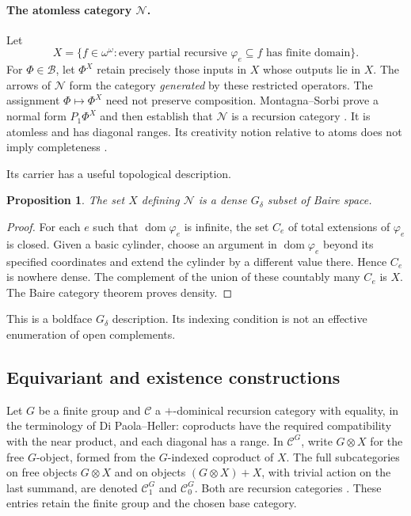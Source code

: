 \documentclass[11pt]{article}
\newtheorem{proposition}[theorem]{Proposition}
\theoremstyle{definition}
\newcommand{\N}{\omega}
\newcommand{\C}{\mathcal C}
\newcommand{\dom}{\operatorname{dom}}
\begin{document}
\paragraph{The atomless category $\mathcal N$.}
Let
\[
 X=\{f\in\N^{\N}:\text{every partial recursive }\varphi_e\subseteq f
                         \text{ has finite domain}\}.
\]
For $\Phi\in\mathcal B$, let $\Phi^X$ retain precisely those inputs
in $X$ whose outputs lie in $X$. The arrows of $\mathcal N$ form the
category \emph{generated} by these restricted operators. The assignment
$\Phi\mapsto\Phi^X$ need not preserve composition. Montagna--Sorbi
prove a normal form $P_1\Phi^X$ and then establish that $\mathcal N$
is a recursion category \cite[Definitions 4.1--4.2, Lemma 4.3,
Proposition 4.1, pp.~1038--1040]{MS}. It is atomless and has diagonal
ranges. Its creativity notion relative to atoms does not imply
completeness \cite[Theorems 4.1--4.2]{MS}.

Its carrier has a useful topological description.
\begin{proposition}\label{prop:dense}
The set $X$ defining $\mathcal N$ is a dense $G_\delta$ subset of
Baire space.
\end{proposition}
\begin{proof}
For each $e$ such that $\dom\varphi_e$ is infinite, the set $C_e$ of
total extensions of $\varphi_e$ is closed. Given a basic cylinder,
choose an argument in $\dom\varphi_e$ beyond its specified coordinates
and extend the cylinder by a different value there. Hence $C_e$ is
nowhere dense. The complement of the union of these countably many
$C_e$ is $X$. The Baire category theorem proves density.
\end{proof}
This is a boldface $G_\delta$ description. Its indexing condition is
not an effective enumeration of open complements.

\subsection{Equivariant and existence constructions}

Let $G$ be a finite group and $\C$ a $+$-dominical recursion category
with equality, in the terminology of Di Paola--Heller: coproducts
have the required compatibility with the near product, and each
diagonal has a range. In $\C^G$,
write $G\otimes X$ for the free $G$-object, formed from the $G$-indexed
coproduct of $X$. The full subcategories on free objects $G\otimes X$
and on objects $(G\otimes X)+X$, with trivial action on the last
summand, are denoted $\C_1^G$ and $\C_0^G$. Both are recursion
categories \cite[Theorem 7.9.9, pp.~620--621]{DPH}.
These entries retain the finite group and the chosen base category.
\end{document}

